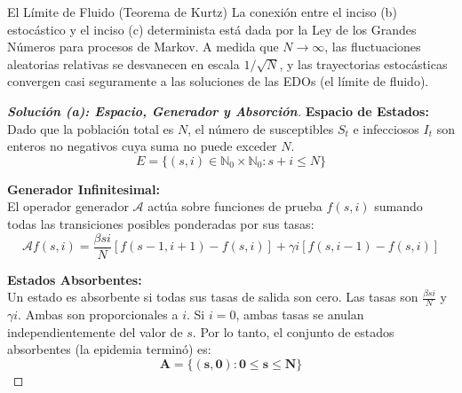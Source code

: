 \documentclass[10pt,a4paper]{article}
\begin{document}
\vspace{2mm}

\begin{nota}{El Límite de Fluido (Teorema de Kurtz)}
    La conexión entre el inciso (b) estocástico y el inciso (c) determinista está dada por la Ley de los Grandes Números para procesos de Markov. A medida que $N \to \infty$, las fluctuaciones aleatorias relativas se desvanecen en escala $1/\sqrt{N}$, y las trayectorias estocásticas convergen casi seguramente a las soluciones de las EDOs (el límite de fluido).
\end{nota}

\begin{proof}[\textbf{Solución (a): Espacio, Generador y Absorción}]
    \textbf{Espacio de Estados:} \\
    Dado que la población total es $N$, el número de susceptibles $S_t$ e infecciosos $I_t$ son enteros no negativos cuya suma no puede exceder $N$.
    \[ E = \{ (s, i) \in \mathbb{N}_0 \times \mathbb{N}_0 : s + i \le N \} \]
    
    \textbf{Generador Infinitesimal:} \\
    El operador generador $\mathcal{A}$ actúa sobre funciones de prueba $f(s,i)$ sumando todas las transiciones posibles ponderadas por sus tasas:
    \[ \mathcal{A}f(s,i) = \frac{\beta s i}{N} [f(s-1, i+1) - f(s,i)] + \gamma i [f(s, i-1) - f(s,i)] \]
    
    \textbf{Estados Absorbentes:} \\
    Un estado es absorbente si todas sus tasas de salida son cero. Las tasas son $\frac{\beta s i}{N}$ y $\gamma i$. Ambas son proporcionales a $i$. Si $i = 0$, ambas tasas se anulan independientemente del valor de $s$. 
    Por lo tanto, el conjunto de estados absorbentes (la epidemia terminó) es:
    \[ \mathbf{A = \{ (s, 0) : 0 \le s \le N \}} \]
\end{proof}

\vspace{5mm}
\end{document}
